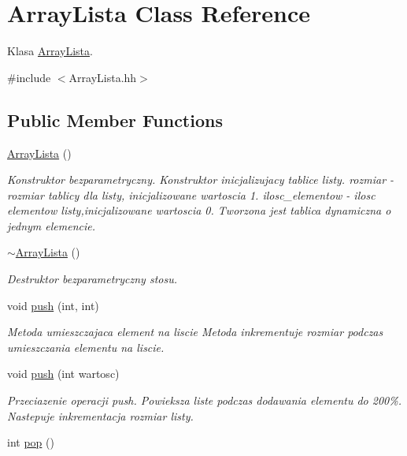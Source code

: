 \hypertarget{a00001}{}\section{Array\+Lista Class Reference}
\label{a00001}


Klasa \hyperlink{a00001}{Array\+Lista}.  




{\ttfamily \#include $<$Array\+Lista.\+hh$>$}

\subsection*{Public Member Functions}
\begin{DoxyCompactItemize}
\item 
\hyperlink{a00001_a645d18dcf43d2f3397d0ba90f5d8d0b4}{Array\+Lista} ()
\begin{DoxyCompactList}\small\item\em Konstruktor bezparametryczny. Konstruktor inicjalizujacy tablice listy. rozmiar -\/ rozmiar tablicy dla listy, inicjalizowane wartoscia 1. ilosc\+\_\+elementow -\/ ilosc elementow listy,inicjalizowane wartoscia 0. Tworzona jest tablica dynamiczna o jednym elemencie. \end{DoxyCompactList}\item 
\hyperlink{a00001_ab502f9c0ea71ec66954ebe675100b9ce}{$\sim$\+Array\+Lista} ()
\begin{DoxyCompactList}\small\item\em Destruktor bezparametryczny stosu. \end{DoxyCompactList}\item 
void \hyperlink{a00001_a473a71ed888097c7b14bb70cbf7eecd6}{push} (int, int)
\begin{DoxyCompactList}\small\item\em Metoda umieszczajaca element na liscie Metoda inkrementuje rozmiar podczas umieszczania elementu na liscie. \end{DoxyCompactList}\item 
void \hyperlink{a00001_a1d194e2d2e54114ef939d7fe64508840}{push} (int wartosc)
\begin{DoxyCompactList}\small\item\em Przeciazenie operacji push. Powieksza liste podczas dodawania elementu do 200\%. Nastepuje inkrementacja rozmiar listy. \end{DoxyCompactList}\item 
int \hyperlink{a00001_ae76ea59ccac91abd264cf108489d3105}{pop} ()

\end{DoxyCompactItemize}
